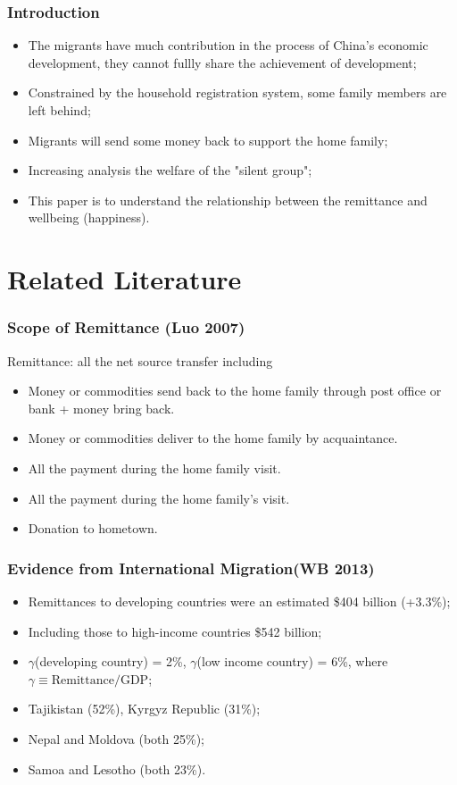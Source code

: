\documentclass[10pt]{beamer}
\begin{document}
\begin{frame}[c]\frametitle{Introduction}
\begin{itemize}
    \item The migrants have much contribution in the process of
    China\rq{}s economic development, they cannot fullly share the achievement of development;
    \item Constrained by the household registration system, some family members are left behind;
    \item Migrants will send some money back to support the home family;
    \item Increasing analysis the welfare of the "silent group";
    \item This paper is to understand the relationship between the remittance and wellbeing (happiness).
\end{itemize}

\end{frame}

\section{Related Literature}

\begin{frame}[c]\frametitle{Scope of Remittance (Luo 2007)}
\alert{Remittance}: all the net source transfer including
\begin{itemize}
    \item Money or commodities send back to the home family through post office or bank + money bring back.
    \item Money or commodities deliver to the home family by acquaintance.
    \item All the payment during the home family visit.
    \item All the payment during the home family\rq{}s visit.
    \item Donation to hometown.
\end{itemize}

\end{frame}

\begin{frame}[c]\frametitle{Evidence from International Migration(WB 2013)}

\begin{itemize}
    \item Remittances to developing countries were an estimated \$404 billion (+3.3\%);
    \item Including those to high-income countries \$542 billion;
    \item $\gamma$(developing country) = 2\%, $\gamma$(low income country) = 6\%, where $\gamma \equiv \text{Remittance}/\text{GDP}$;
    \item Tajikistan (52\%), Kyrgyz Republic (31\%);
    \item Nepal and Moldova (both 25\%);
    \item Samoa and Lesotho (both 23\%).
\end{itemize}

\end{frame}
\end{document}
